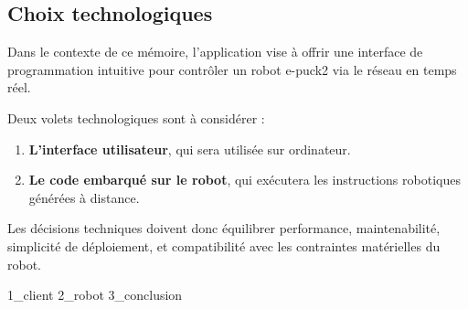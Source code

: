 \subsection{Choix technologiques} \label{sec:choix_technos}
Dans le contexte de ce mémoire, l'application vise à offrir une interface de programmation intuitive pour contrôler un robot e-puck2 via le réseau en temps réel.

Deux volets technologiques sont à considérer :
\begin{enumerate}
    \item \textbf{L'interface utilisateur}, qui sera utilisée sur ordinateur.
    \item \textbf{Le code embarqué sur le robot}, qui exécutera les instructions robotiques générées à distance.
\end{enumerate}

Les décisions techniques doivent donc équilibrer performance, maintenabilité, simplicité de déploiement, et compatibilité avec les contraintes matérielles du robot.

{1_client}
{2_robot}
{3_conclusion}
